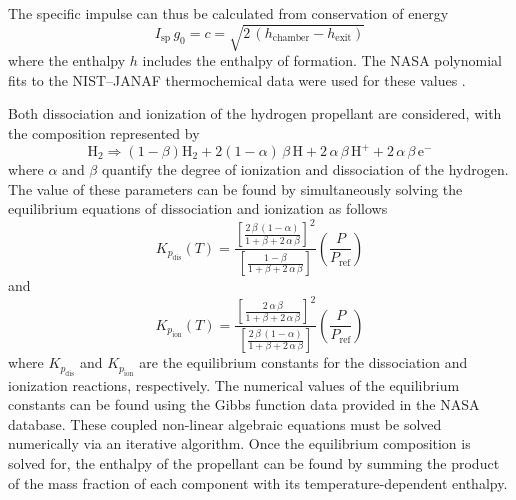 \documentclass[final,3p,times,twocolumn,sort&compress, lefttitle]{elsarticle}
\begin{document}
            The specific impulse can thus be calculated from conservation of energy
            \begin{equation}
                I_{\mathrm{sp}} \, g_0 = c = \sqrt{2 \, \left ( h_{\mathrm{chamber}} - h_\mathrm{exit} \right )} 
            \end{equation}
            where the enthalpy $h$ includes the enthalpy of formation.  The NASA polynomial fits to the NIST--JANAF thermochemical data were used for these values \cite{mcbride_nasa_2002}.
            
            Both dissociation and ionization of the hydrogen propellant are considered, with the composition represented by
            \begin{equation}
                \mathrm{H}_2 \Rightarrow \left (1-\beta \right )\mathrm{H}_2 + 2 \left (1-\alpha   \right ) \, \beta \, \mathrm{H} + 2 \, \alpha \, \beta \, \mathrm{H}^+ + 2\,   \alpha \, \beta \, \mathrm{e}^-
            \end{equation}
             where $\alpha$ and $\beta$ quantify the degree of ionization and dissociation of the hydrogen. The value of these parameters can be found by simultaneously solving the equilibrium equations of dissociation and ionization as follows 
            \begin{equation}
                K_{p_\mathrm{dis}}(T) = \frac
                { \left[{\frac{2 \, \beta \, (1- \alpha)}{ 1 + \beta + 2 \, \alpha \, \beta}}  \right]^2}
                { \left[{\frac{1 - \beta}{ 1 + \beta + 2 \, \alpha \, \beta}}  \right]} \left(\frac{P}{P_\mathrm{ref}} \right)
            \end{equation}
            and
            \begin{equation}
                K_{p_\mathrm{ion}}(T) = \frac
                { \left[{\frac{2 \, \alpha \, \beta }{ 1 + \beta + 2 \, \alpha \, \beta}}  \right]^2}
                { \left[{\frac{2 \, \beta \, (1 - \alpha)}{ 1 + \beta + 2 \, \alpha \, \beta}}  \right]} \left(\frac{P}{P_\mathrm{ref}} \right)
            \end{equation}
             where $K_{p_\mathrm{dis}}$ and $K_{p_\mathrm{ion}}$ are the equilibrium constants for the dissociation and ionization reactions, respectively.  The numerical values of the equilibrium constants can be found using the Gibbs function data provided in the NASA database. These coupled non-linear algebraic equations must be solved numerically via an iterative algorithm. Once the equilibrium composition is solved for, the enthalpy of the propellant can be found by summing the product of the mass fraction of each component with its temperature-dependent enthalpy.
            
\end{document}
